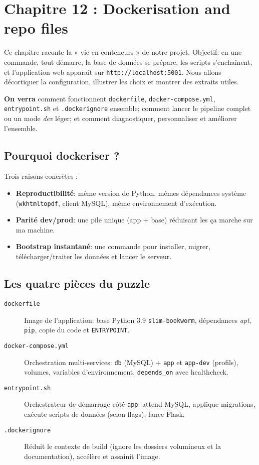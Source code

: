\chapter{Chapitre 12 : Dockerisation and repo files}

Ce chapitre raconte la « vie en conteneurs » de notre projet. Objectif: en une commande, tout démarre, la base de données se prépare, les scripts s'enchaînent, et l'application web apparaît sur \texttt{http://localhost:5001}. Nous allons décortiquer la configuration, illustrer les choix et montrer des extraits utiles.

\medskip
\noindent\textbf{On verra} comment fonctionnent \texttt{dockerfile}, \texttt{docker-compose.yml}, \texttt{entrypoint.sh} et \texttt{.dockerignore} ensemble; comment lancer le pipeline complet ou un mode \textit{dev} léger; et comment diagnostiquer, personnaliser et améliorer l'ensemble.

\section{Pourquoi dockeriser ?}

Trois raisons concrètes :
\begin{itemize}
  \item \textbf{Reproductibilité}: même version de Python, mêmes dépendances système (\texttt{wkhtmltopdf}, client MySQL), même environnement d'exécution.
  \item \textbf{Parité dev/prod}: une pile unique (app + base) réduisant les \og ça marche sur ma machine\fg{}.
  \item \textbf{Bootstrap instantané}: une commande pour installer, migrer, télécharger/traiter les données et lancer le serveur.
\end{itemize}

\section{Les quatre pièces du puzzle}

\begin{description}
  \item[\texttt{dockerfile}] Image de l'application: base Python 3.9 \texttt{slim-bookworm}, dépendances \textit{apt}, \texttt{pip}, copie du code et \texttt{ENTRYPOINT}.
  \item[\texttt{docker-compose.yml}] Orchestration multi-services: \texttt{db} (MySQL) + \texttt{app} et \texttt{app-dev} (profils), volumes, variables d'environnement, \texttt{depends\_on} avec healthcheck.
  \item[\texttt{entrypoint.sh}] Orchestrateur de démarrage côté \texttt{app}: attend MySQL, applique migrations, exécute scripts de données (selon flags), lance Flask.
  \item[\texttt{.dockerignore}] Réduit le contexte de build (ignore les dossiers volumineux et la documentation), accélère et assainit l'image.
\end{description}

